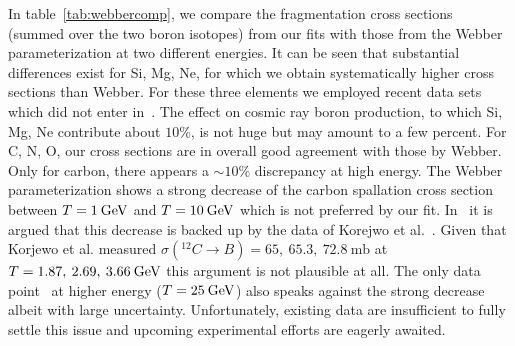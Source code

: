 \documentclass[a4paper,11pt]{article}
\newcommand{\eVdist}{\kern-0.06em}
\newcommand{\gev}{\:\text{Ge\eVdist V}}
\newcommand{\mb}{\:\text{mb}}
\begin{document}
In table~\ref{tab:webbercomp}, we compare the fragmentation cross sections (summed over the two boron isotopes) from our fits with those from the Webber parameterization at two different energies. It can be seen that substantial differences exist for Si, Mg, Ne, for which we obtain systematically higher cross sections than Webber. For these three elements we employed recent data sets which did not enter in~\cite{Webber:2003}. The effect on cosmic ray boron production, to which Si, Mg, Ne contribute about $10\%$, is not huge but may amount to a few percent. For C, N, O, our cross sections are in overall good agreement with those by Webber. Only for carbon, there appears a $\sim10\%$ discrepancy at high energy. The Webber parameterization shows a strong decrease of the carbon spallation cross section between $T=1\gev$ and $T=10\gev$ which is not preferred by our fit. In~\cite{Webber:2003} it is argued that this decrease is backed up by the data of Korejwo et al.~\cite{Korejwo:2000pf,Korejwo:2002ts}. Given that Korjewo et al. measured $\sigma({^{12}}C\rightarrow B)=65,\:65.3,\:72.8\mb$ at $T=1.87,\:2.69,\:3.66\gev$ this argument is not plausible at all. The only data point~\cite{Fontes:1977qq} at higher energy ($T=25\gev$) also speaks against the strong decrease albeit with large uncertainty. Unfortunately, existing data are insufficient to fully settle this issue and upcoming experimental efforts are eagerly awaited. 
\end{document}
